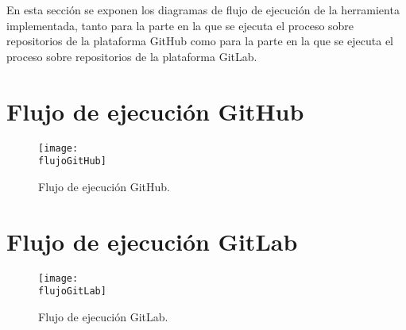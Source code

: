 En esta sección se exponen los diagramas de flujo de ejecución de la herramienta implementada, tanto para la parte en la que se ejecuta el proceso sobre repositorios de la plataforma GitHub como para la parte en la que se ejecuta el proceso sobre repositorios de la plataforma GitLab.

\newpage

\section{Flujo de ejecución GitHub}

\begin{figure}[h!]
    \centering
    \texttt{[image: \\flujoGitHub]}
    \caption{Flujo de ejecución GitHub.}
\end{figure}

\newpage

\section{Flujo de ejecución GitLab}

\begin{figure}[h!]
    \centering
    \texttt{[image: \\flujoGitLab]}
    \caption{Flujo de ejecución GitLab.}
\end{figure}